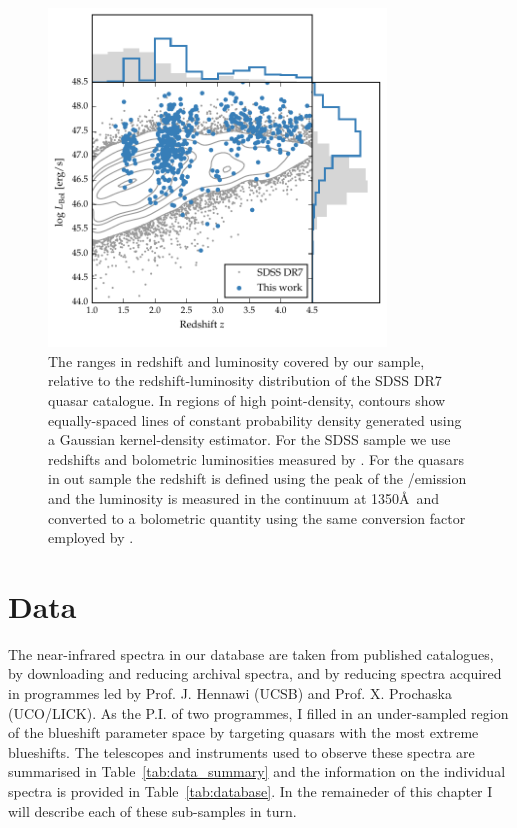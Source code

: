 \begin{figure}
    \includegraphics[width=0.8\textwidth]{figures/chapter02/luminosity_z.pdf} 
    \caption[{The ranges in redshift and luminosity covered by our sample, relative to the redshift-luminosity distribution of the SDSS DR7 quasar catalogue.}]{The ranges in redshift and luminosity covered by our sample, relative to the redshift-luminosity distribution of the SDSS DR7 quasar catalogue. In regions of high point-density, contours show equally-spaced lines of constant probability density generated using a Gaussian kernel-density estimator. For the SDSS sample we use \citet{hewett10} redshifts and bolometric luminosities measured by \citet{shen11}. For the quasars in out sample the redshift is defined using the peak of the \hans/\hb emission and the luminosity is measured in the continuum at 1350\AA\, and converted to a bolometric quantity using the same conversion factor employed by \citet{shen11}. }     
    \label{fig:lzplane}
\end{figure}


\section{Data}

The near-infrared spectra in our database are taken from published catalogues, by downloading and reducing
archival spectra, and by reducing spectra acquired in programmes led by Prof. J. Hennawi (UCSB) and Prof. X. Prochaska (UCO/LICK). 
As the P.I. of two programmes, I filled in an under-sampled region of the  blueshift parameter space by targeting quasars with the most extreme  blueshifts.
The telescopes and instruments used to observe these spectra are summarised in Table~\ref{tab:data_summary} and the information on the individual spectra is provided in Table~\ref{tab:database}.
In the remaineder of this chapter I will describe each of these sub-samples in turn. 

